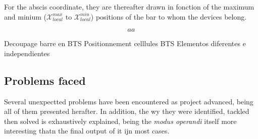 For the abscis coordinate, they are thereafter drawn in fonction of the maximum and minium (\( \mathscr{X}_{local}^{max}\) to \( \mathscr{X}_{local}^{min}\)) positions of the bar to whom the devices belong.

\begin{equation}
    aa
\end{equation}


Decoupage barre en BTS
Positionnement celllules BTS
Elementos diferentes e independientes



\subsection{Problems faced}

Several unexpectted problems have been encountered as project advanced, being all of them presented herafter. In addition, the wy they were identified, tackled then solved is exhaustively explained, being the \textit{modus operandi} itself more interesting thatn the final output of it ijn most cases.

